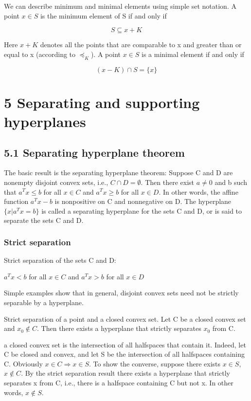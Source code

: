 \documentclass{article}
\begin{document}
We can describe minimum and minimal elements using simple set notation. A
point $x \in S$ is the minimum element of S if and only if

\[
S\subseteq x+K    
\]

Here $x+K$ denotes all the points that are comparable to x and greater than or
equal to x (according to $\preceq_K$). A point $x \in S$ is a minimal element if and only if

\[
(x-K)\cap S=\{x\}    
\]

\section*{5 Separating and supporting hyperplanes}

\subsection*{5.1 Separating hyperplane theorem}

The basic result is the separating hyperplane theorem: Suppose C and D are nonempty disjoint
convex sets, i.e., $C \cap D=\emptyset$. Then there exist $a \ne 0$ and b such that $a^T x\le b$
for all $x \in C$ and $a^T x\ge b$ for all $x \in D$. In other words, the affine function $a^T x-b$
is nonpositive on C and nonnegative on D. The hyperplane $\{x|a^T x=b\}$ is called
a separating hyperplane for the sets C and D, or is said to separate the sets C and D.


\subsubsection*{Strict separation}

Strict separation of the sets C and D:

\begin{center}
    $a^T x < b$ for all $x \in C$ and $a^T x > b$ for all $x \in D$
\end{center}

Simple examples show that in general, disjoint convex sets need not be strictly separable by a hyperplane.

Strict separation of a point and a closed convex set. 
Let C be a closed convex set and $x_0\notin C$. Then there exists a hyperplane that strictly separates $x_0$
from C.

a closed convex set is the intersection of all halfspaces that contain it. Indeed,
let C be closed and convex, and let S be the intersection of all halfspaces containing
C. Obviously $x \in C \Rightarrow x \in S$. To show the converse, suppose there exists $x \in S$,
$x \notin C$. By the strict separation result there exists a hyperplane that strictly separates
x from C, i.e., there is a halfspace containing C but not x. In other words, $x \notin S$.
\end{document}
